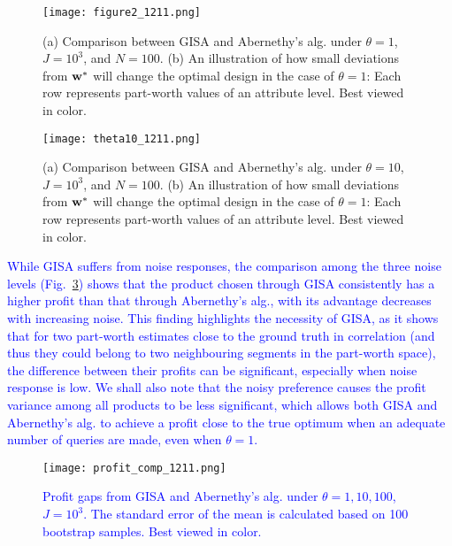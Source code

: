 \documentclass[onecolumn,11pt]{article}
\newcommand{\highlight}[1]{{\textcolor{blue}{{#1}}}}
\newcommand{\highlight}[1]{{{#1}}}
\begin{document}
\begin{figure}
\centering
\texttt{[image: figure2\_1211.png]}
\caption{(a) Comparison between GISA and Abernethy's alg. under $\theta=1$, $J=10^3$, and $N=100$. (b) An illustration of how small deviations from ${\bf w}^*$ will change the optimal design in the case of $\theta=1$: Each row represents part-worth values of an attribute level. Best viewed in color.}
\label{fig:theta1}
\end{figure}
\begin{figure}
\centering
\texttt{[image: theta10\_1211.png]}
\caption{(a) Comparison between GISA and Abernethy's alg. under $\theta=10$, $J=10^3$, and $N=100$. (b) An illustration of how small deviations from ${\bf w}^*$ will change the optimal design in the case of $\theta=1$: Each row represents part-worth values of an attribute level. Best viewed in color.}
\label{fig:theta10}
\end{figure}

\highlight{While GISA suffers from noise responses, the comparison among the three noise levels (Fig.~\ref{fig:profitthetacomp}) shows that the product chosen through GISA consistently has a higher profit than that through Abernethy's alg., with its advantage decreases with increasing noise.   
This finding highlights the necessity of GISA, as it shows that for two part-worth estimates close to the ground truth in correlation (and thus they could belong to two neighbouring segments in the part-worth space), the difference between their profits can be significant, especially when noise response is low. We shall also note that the noisy preference causes the profit variance among all products to be less significant, which allows both GISA and Abernethy's alg. to achieve a profit close to the true optimum when an adequate number of queries are made, even when $\theta=1$.}  
\begin{figure}
\centering
\texttt{[image: profit\_comp\_1211.png]}
\caption{\highlight{Profit gaps from GISA and Abernethy's alg. under $\theta=1, 10, 100$, $J=10^3$. The standard error of the mean is calculated based on 100 bootstrap samples. Best viewed in color.}}
\label{fig:profitthetacomp}
\end{figure}
\end{document}
